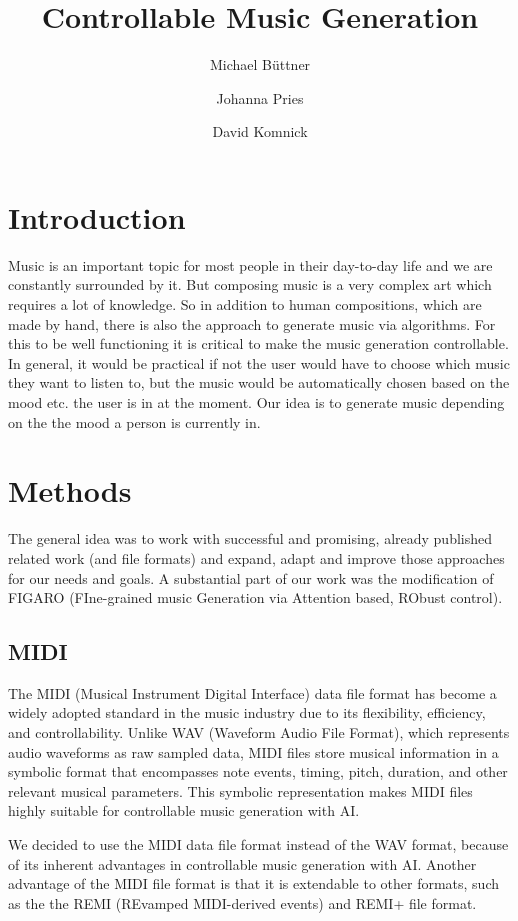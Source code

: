 \documentclass{article}
\title{\textbf{Controllable Music Generation}}
\author{Michael Büttner \and Johanna Pries \and David Komnick}
\date{\vspace{-3ex}}
\begin{document}
\maketitle

\section{Introduction}
Music is an important topic for most people in their day-to-day life and we are constantly surrounded by it. But composing music is a very complex art which requires a lot of knowledge. So in addition to human compositions, which are made by hand, there is also the approach to generate music via algorithms. For this to be well functioning it is critical to make the music generation controllable. In general, it would be practical if not the user would have to choose which music they want to listen to, but the music would be automatically chosen based on the mood etc. the user is in at the moment.
Our idea is to generate music depending on the the mood a person is currently in. 


\section{Methods}
The general idea was to work with successful and promising, already published related work (and file formats) and expand, adapt and improve those approaches for our needs and goals. A substantial part of our work was the modification of FIGARO (FIne-grained music Generation via Attention based, RObust control).

\subsection{MIDI}
The MIDI (Musical Instrument Digital Interface) data file format has become a widely adopted standard in the music industry due to its flexibility, efficiency, and controllability. Unlike WAV (Waveform Audio File Format), which represents audio waveforms as raw sampled data, MIDI files store musical information in a symbolic format that encompasses note events, timing, pitch, duration, and other relevant musical parameters. This symbolic representation makes MIDI files highly suitable for controllable music generation with AI.

We decided to use the MIDI data file format instead of the WAV format, because of its inherent advantages in controllable music generation with AI. Another advantage of the MIDI file format is that it is extendable to other formats, such as the the REMI (REvamped MIDI-derived events) \cite{DBLP:journals/corr/abs-2002-00212} and REMI+ \cite{von2022figaro} file format.
\end{document}
